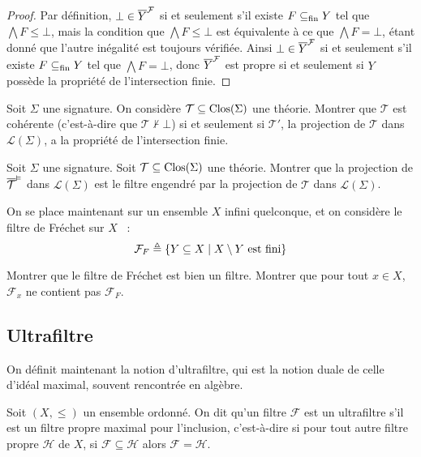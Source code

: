 \begin{proof}
  Par définition, $\bot\in \overline{Y}^{\mathcal F}$ si et seulement s'il existe $F\subseteq_{\mathrm{fin}} Y$
  tel que $\bigwedge F \leq \bot$, mais la condition que $\bigwedge F\leq \bot$
  est équivalente à ce que $\bigwedge F = \bot$, étant donné que l'autre
  inégalité est toujours vérifiée. Ainsi $\bot\in\overline{Y}^{\mathcal F}$ si et seulement
  s'il existe $F\subseteq_{\mathrm{fin}} Y$ tel que $\bigwedge F = \bot$, donc $\overline{Y}^{\mathcal F}$ est
  propre si et seulement si $Y$ possède la propriété de l'intersection finie.
\end{proof}

\begin{exercise}
  Soit $\Sigma$ une signature. On considère $\mathcal T\subseteq\operatorname{Clos}(\Sigma)$
  une théorie. Montrer que $\mathcal T$ est cohérente (c'est-à-dire que
  $\mathcal T\nvdash \bot$) si et seulement si $\mathcal T'$, la projection
  de $\mathcal T$ dans $\mathcal L(\Sigma)$, a la propriété de l'intersection
  finie.
\end{exercise}

\begin{exercise}
  Soit $\Sigma$ une signature. Soit $\mathcal T\subseteq\operatorname{Clos}(\Sigma)$ une
  théorie. Montrer que la projection de $\overline{\mathcal T}^{\vDash}$ dans
  $\mathcal L(\Sigma)$ est le filtre engendré par la projection de $\mathcal T$
  dans $\mathcal L(\Sigma)$.
\end{exercise}

\begin{exercise}
  On se place maintenant sur un ensemble $X$ infini quelconque, et on considère
  le filtre de Fréchet sur $X$~ :
  \[\mathcal F_F \triangleq \{Y\subseteq X \mid X \setminus Y\text{ est fini}\}\]

  Montrer que le filtre de Fréchet est bien un filtre. Montrer que pour tout
  $x \in X$, $\mathcal F_x$ ne contient pas $\mathcal F_F$.
\end{exercise}

\subsection{Ultrafiltre}\label{sbsct.ultrafiltre}

On définit maintenant la notion d'ultrafiltre, qui est la notion duale de celle
d'idéal maximal, souvent rencontrée en algèbre.

\begin{definition}[Ultrafiltre]
  Soit $(X,\leq)$ un ensemble ordonné. On dit qu'un filtre $\mathcal F$ est un
  ultrafiltre s'il est un filtre propre maximal pour l'inclusion, c'est-à-dire
  si pour tout autre filtre propre $\mathcal H$ de $X$, si
  $\mathcal F \subseteq\mathcal H$ alors $\mathcal F = \mathcal H$.
\end{definition}

